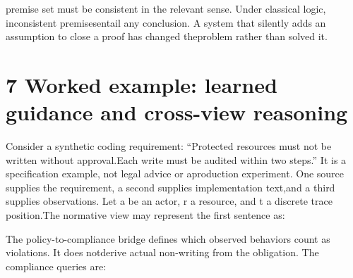 \noindent
premise set must be consistent in the relevant sense. Under classical logic, inconsistent premises\linebreak[4]
entail any conclusion. A system that silently adds an assumption to close a proof has changed the\linebreak[4]
problem rather than solved it.\par

\section*{7  Worked example: learned guidance and cross-view reasoning}
\noindent
Consider a synthetic coding requirement: ``Protected resources must not be written without approval.\linebreak[4]
Each write must be audited within two steps.'' It is a specification example, not legal advice or a\linebreak[4]
production experiment. One source supplies the requirement, a second supplies implementation text,\linebreak[4]
and a third supplies observations. Let a be an actor, r a resource, and t a discrete trace position.\linebreak[4]
The normative view may represent the first sentence as:\par


\noindent
The policy-to-compliance bridge defines which observed behaviors count as violations. It does not\linebreak[4]
derive actual non-writing from the obligation. The compliance queries are:\par

